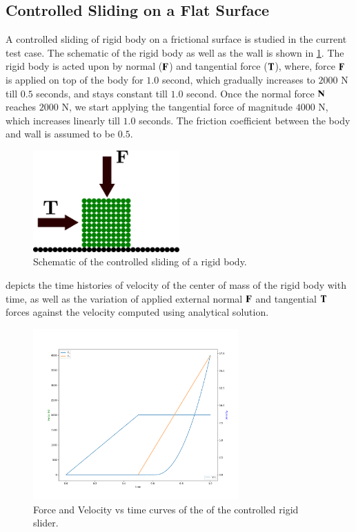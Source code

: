 \subsection{Controlled Sliding on a Flat Surface}
\label{sec:controlled-rigid-body-sliding}
A controlled sliding of rigid body on a frictional surface is studied in the
current test case. The schematic of the rigid body as well as the wall is shown
in \cref{fig:schematic-controlled-rigid-body-sliding}. The rigid body is acted
upon by normal ($\mathbf{F}$) and tangential force ($\mathbf{T}$), where, force
$\mathbf{F}$ is applied on top of the body for $1.0$ second, which gradually
increases to $2000$ N till $0.5$ seconds, and stays constant till $1.0$ second.
Once the normal force $\mathbf{N}$ reaches $2000$ N, we start applying the
tangential force of magnitude $4000$ N, which increases linearly till $1.0$
seconds. The friction coefficient between the body and wall is assumed to be
$0.5$.
\begin{figure}[!htpb]
  \centering
  \includegraphics[width=0.5\textwidth]{images/rfc/images/controlled_rigid_body_sliding/schematic}
  \caption{Schematic of the controlled sliding of a rigid body.}
\label{fig:schematic-controlled-rigid-body-sliding}
\end{figure}

 depicts the time histories of
velocity of the center of mass of the rigid body with time, as well as the
variation of applied external normal $\mathbf{F}$ and tangential $\mathbf{T}$
forces against the velocity computed using analytical solution.
\begin{figure}[!htpb]
  \centering
  \includegraphics[width=0.7\textwidth]{figures/rfc/figures/mohseni_2021_controlled_sliding_on_a_flat_surface_2d/case_1/force_velocity_vs_t}
  \caption{Force and Velocity vs time curves of the of the controlled rigid slider.}
\label{fig:velocity-vs-time-controlled-sliding}
\end{figure}


